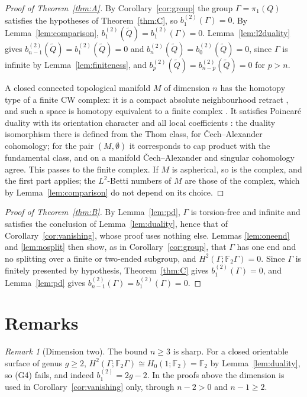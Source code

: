 \documentclass[11pt,a4paper]{article}
\theoremstyle{definition}
\theoremstyle{remark}
\newtheorem{remark}[lemma]{Remark}
\newcommand{\F}{\mathbb{F}}
\newcommand{\Gam}{\Gamma}
\newcommand{\bt}[1]{b^{(2)}_{#1}}
\begin{document}
\begin{proof}[Proof of Theorem~\ref{thm:A}]
By Corollary~\ref{cor:group} the group $\Gam=\pi_1(Q)$ satisfies the hypotheses of
Theorem~\ref{thm:C}, so $\bt{1}(\Gam)=0$. By Lemma~\ref{lem:comparison},
$\bt{1}(\widetilde Q)=\bt{1}(\Gam)=0$. Lemma~\ref{lem:l2duality} gives
$\bt{n-1}(\widetilde Q)=\bt{1}(\widetilde Q)=0$ and
$\bt{n}(\widetilde Q)=\bt{0}(\widetilde Q)=0$, since $\Gam$ is infinite by
Lemma~\ref{lem:finiteness}, and $\bt{p}(\widetilde Q)=\bt{n-p}(\widetilde Q)=0$ for
$p>n$.

A closed connected topological manifold $M$ of dimension $n$ has the homotopy
type of a finite CW complex: it is a compact absolute neighbourhood retract
\cite[Theorems 3.2 and 3.3]{Ha}, and such a space is homotopy equivalent to a
finite complex \cite[Corollary~5.3]{We}. It satisfies Poincar\'e duality with its
orientation character and all local coefficients
\cite[Theorem~10.2 and Remark~10.3]{Sp}: the duality isomorphism there is
defined from the Thom class, for \v{C}ech--Alexander cohomology; for the pair
$(M,\emptyset)$ it corresponds to cap product with the fundamental class, and
on a manifold \v{C}ech--Alexander and singular cohomology agree. This passes to
the finite complex.
If $M$ is aspherical, so is the complex, and the first part applies; the
$L^2$-Betti numbers of $M$ are those of the complex, which by
Lemma~\ref{lem:comparison} do not depend on its choice.
\end{proof}

\begin{proof}[Proof of Theorem~\ref{thm:B}]
By Lemma~\ref{lem:pd}, $\Gam$ is torsion-free and infinite and satisfies the
conclusion of Lemma~\ref{lem:duality}, hence that of
Corollary~\ref{cor:vanishing}, whose proof uses nothing else. Lemmas
\ref{lem:oneend} and \ref{lem:nosplit} then show, as in
Corollary~\ref{cor:group}, that $\Gam$ has one end and no splitting over a finite
or two-ended subgroup, and $H^2(\Gam;\F_2\Gam)=0$. Since $\Gam$ is finitely presented
by hypothesis, Theorem~\ref{thm:C} gives $\bt{1}(\Gam)=0$, and Lemma~\ref{lem:pd}
gives $\bt{n-1}(\Gam)=\bt{1}(\Gam)=0$.
\end{proof}

\section{Remarks}

\begin{remark}[Dimension two]
The bound $n\ge3$ is sharp. For a closed orientable surface of genus $g\ge2$,
$H^2(\Gam;\F_2\Gam)\cong H_0(1;\F_2)=\F_2$ by Lemma~\ref{lem:duality}, so (G4) fails,
and indeed $\bt{1}=2g-2$. In the proofs above the dimension is used in
Corollary~\ref{cor:vanishing} only, through $n-2>0$ and $n-1\ge2$.
\end{remark}
\end{document}
